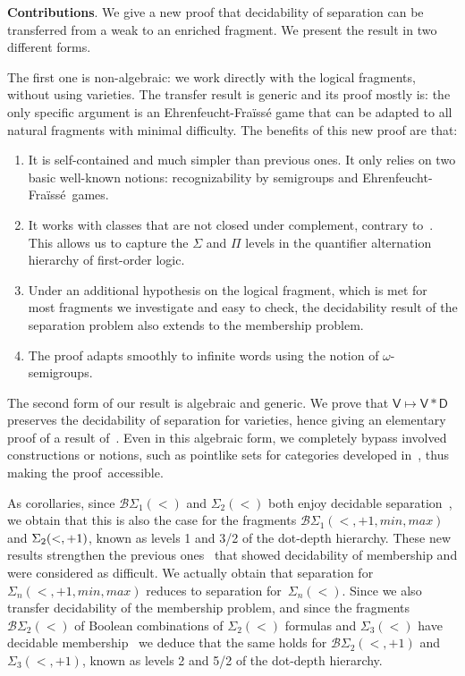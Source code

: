 \documentclass[a4paper,USenglish]{lipics}
\newcommand{\efgame}{Ehrenfeucht-Fra\"iss\'e\xspace}
\newcommand{\plus}{\ensuremath{+1,min,max}}
\newcommand{\sio}[1]{\ensuremath{\Sigma_{#1}(<)}\xspace}
\newcommand{\sip}[1]{\ensuremath{\Sigma_{#1}(<,\plus)}\xspace}
\newcommand{\bso}[1]{\ensuremath{\mathcal{B}\Sigma_{#1}(<)}\xspace}
\newcommand{\bsp}[1]{\ensuremath{\mathcal{B}\Sigma_{#1}(<,\plus)}\xspace}
\newcommand{\sdp}{\ensuremath{\Sigma_{2}(<,+1)}\xspace}
\newcommand{\bdp}{\ensuremath{\mathcal{B}\Sigma_{2}(<,+1)}\xspace}
\newcommand{\stp}{\ensuremath{\Sigma_{3}(<,+1)}\xspace}
\newcommand\highlight[1]{\par\bigskip\noindent\textbf{\sffamily #1}.}
\theoremstyle{plain}
\begin{document}
\highlight{Contributions} We give a new
proof that decidability of separation can be transferred from a weak to an
enriched fragment. We present the result in two different forms.

The first one is non-algebraic: we work directly with the logical fragments,
without using varieties. The transfer result is generic and its proof mostly
is: the only specific argument is an \efgame game that can be adapted
to all natural fragments with minimal difficulty. The
benefits of this new proof are that:
\begin{enumerate}
\item It is self-contained and much simpler than
  previous ones. It only relies on two basic well-known notions:
  recognizability by semigroups and \efgame~games.
\item It works with classes that are not closed under complement, contrary
  to~\cite{Steinberg:delay-pointlikes:2001}. This allows us to capture the
  $\Sigma$ and $\Pi$ levels in the quantifier alternation hierarchy of
  first-order logic.
\item Under an additional hypothesis on the logical fragment, which is met for
  most fragments we investigate and easy to check, the decidability result of
  the separation problem also extends to the membership problem.
\item The proof adapts smoothly to infinite words using
  the notion of $\omega$-semigroups.
\end{enumerate}

The second form of our result is algebraic and generic. We prove that
$\mathsf{V} \mapsto \mathsf{V} \ast \mathsf{D}$ preserves the decidability of
separation for varieties, hence giving an elementary proof of a result
of~\cite{Steinberg:delay-pointlikes:2001}. Even in this algebraic form, we
completely bypass involved constructions or notions, such as pointlike sets
for categories developed in~\cite{Steinberg:delay-pointlikes:2001}, thus
making the proof~accessible.

As corollaries, since $\bso 1$ and $\sio2$ both enjoy decidable
separation~\cite{sep_icalp13,DBLP:conf/mfcs/PlaceRZ13,PZ:icalp14}, we obtain
that this is also the case for the fragments $\bsp1$ and  $\mbox{\sdp}$, known as
levels 1 and 3/2 of the dot-depth hierarchy. These new results strengthen the
previous ones~\cite{Knast:dd1:1983a,glasser-dd3/2} that showed
decidability of membership and were considered as difficult.
We actually obtain that separation for $\sip n$ reduces to separation for~$\sio n$.
Since we also transfer decidability of the membership problem, and
since  the fragments $\bso2$ of Boolean combinations of $\sio2$
formulas and $\sio3$ have decidable membership~\cite{PZ:icalp14} we deduce
that the same holds for $\bdp$ and $\stp$, known as levels 2 and 5/2 of
the dot-depth hierarchy.
\end{document}

